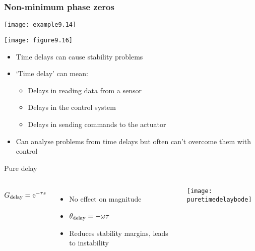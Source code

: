 \documentclass{beamer-control}
\begin{document}

\begin{frame}
\frametitle{Non-minimum phase zeros}
\texttt{[image: example9.14]}

\texttt{[image: figure9.16]}

\end{frame}


\begin{frame}
  \begin{itemize}
    \item  Time delays can cause stability problems
    \item  `Time delay' can mean:
    \begin{itemize}
      \item  Delays in reading data from a sensor
      \item  Delays in the control system
      \item  Delays in sending commands to the actuator
    \end{itemize}
    \item Can analyse problems from time delays but often can't overcome them with control
  \end{itemize}
\end{frame}

\begin{frame}{Pure delay}
\begin{columns}
  \[
    G_{\mathrm{delay}} = \mathrm{e}^{-\tau s}
  \]
\begin{itemize}
  \item No effect on magnitude
  \item $\theta_{\mathrm{delay}}=-\omega \tau$
  \item Reduces stability margins, leads to instability
\end{itemize}

    \texttt{[image: puretimedelaybode]}
\end{columns}
\end{frame}
\end{document}
